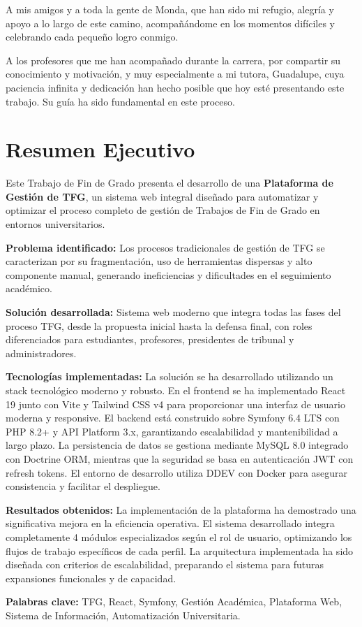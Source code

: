 A mis amigos y a toda la gente de Monda, que han sido mi refugio, alegría y apoyo a lo largo de este camino, acompañándome en los momentos difíciles y celebrando cada pequeño logro conmigo.

A los profesores que me han acompañado durante la carrera, por compartir su conocimiento y motivación, y muy especialmente a mi tutora, Guadalupe, cuya paciencia infinita y dedicación han hecho posible que hoy esté presentando este trabajo. Su guía ha sido fundamental en este proceso.

\newpage
\thispagestyle{plain}
\chapter*{Resumen Ejecutivo}

Este Trabajo de Fin de Grado presenta el desarrollo de una \textbf{Plataforma 
de Gestión de TFG}, un sistema web integral diseñado para automatizar y 
optimizar el proceso completo de gestión de Trabajos de Fin de Grado en 
entornos universitarios.

\textbf{Problema identificado:} Los procesos tradicionales de gestión de TFG 
se caracterizan por su fragmentación, uso de herramientas dispersas y 
alto componente manual, generando ineficiencias y dificultades en el 
seguimiento académico.

\textbf{Solución desarrollada:} Sistema web moderno que integra todas las 
fases del proceso TFG, desde la propuesta inicial hasta la defensa final, 
con roles diferenciados para estudiantes, profesores, presidentes de 
tribunal y administradores.

\textbf{Tecnologías implementadas:} La solución se ha desarrollado utilizando un stack tecnológico moderno y robusto. En el frontend se ha implementado React 19 junto con Vite y Tailwind CSS v4 para proporcionar una interfaz de usuario moderna y responsive. El backend está construido sobre Symfony 6.4 LTS con PHP 8.2+ y API Platform 3.x, garantizando escalabilidad y mantenibilidad a largo plazo. La persistencia de datos se gestiona mediante MySQL 8.0 integrado con Doctrine ORM, mientras que la seguridad se basa en autenticación JWT con refresh tokens. El entorno de desarrollo utiliza DDEV con Docker para asegurar consistencia y facilitar el despliegue.

\textbf{Resultados obtenidos:} La implementación de la plataforma ha demostrado una significativa mejora en la eficiencia operativa. El sistema desarrollado integra completamente 4 módulos especializados según el rol de usuario, optimizando los flujos de trabajo específicos de cada perfil. La arquitectura implementada ha sido diseñada con criterios de escalabilidad, preparando el sistema para futuras expansiones funcionales y de capacidad.

\textbf{Palabras clave:} TFG, React, Symfony, Gestión Académica, Plataforma Web, 
Sistema de Información, Automatización Universitaria.

\newpage
